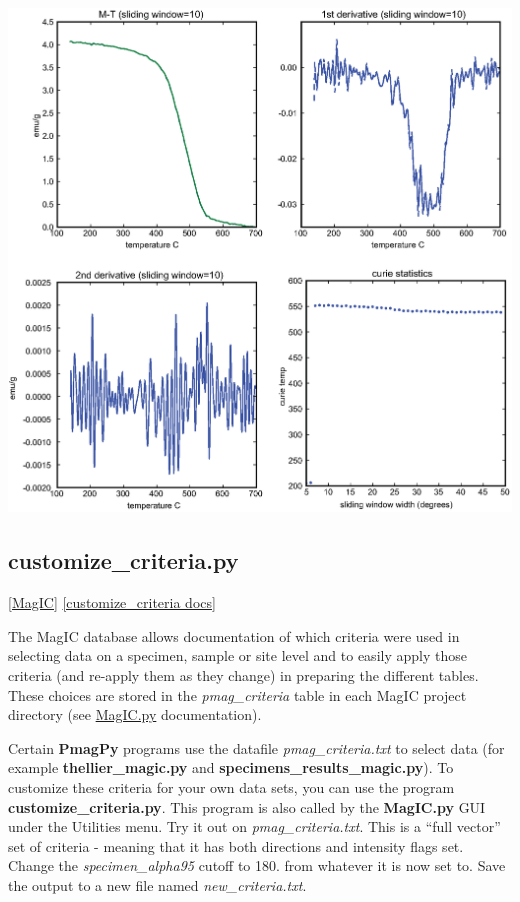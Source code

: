 \documentclass[11pt]{book}
\begin{document}
{{{%
{%
  \includegraphics[width=14.5 cm]{EPSfiles/curie-ex.eps}}


\subsection{customize\_criteria.py} 
\href{#MagIC}{[MagIC]}
\href{http://earthref.org/PmagPy/pmagpydocs/customize_criteria-module.html}{[customize\_criteria docs]}

The MagIC database allows documentation of which criteria were used in selecting data on a specimen, sample or site level and to easily apply those criteria (and re-apply them as they change) in preparing the different tables.  These choices are stored in the {\it pmag\_criteria} table in each MagIC project directory (see \href{#MagIC.py}{MagIC.py} documentation).

 Certain {\bf PmagPy} programs use the datafile {\it pmag\_criteria.txt} to select data (for example {\bf thellier\_magic.py} and {\bf specimens\_results\_magic.py}).  To customize these criteria for your own data sets, you can use the program {\bf customize\_criteria.py}.  This program is also called by the {\bf MagIC.py} GUI under the Utilities menu.    Try it out on {\it pmag\_criteria.txt}.   This is a ``full vector'' set of criteria - meaning that it has both directions and intensity flags set.  Change the {\it specimen\_alpha95} cutoff to 180. from whatever it is now set to.   Save the output to a new file named {\it new\_criteria.txt}.

}}}
\end{document}
